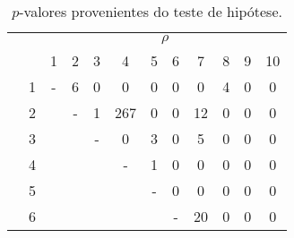 \begin{table}[phtb!]
\centering
\caption{$p$-valores provenientes do teste de hipótese.}
\begin{tabular}{cccccccccccc}
                         &    & \multicolumn{10}{c}{$\rho$}                                                                                                                                                                                                                           \\ \cline{3-12} 
                         &    & 1 & 2                        & 3                        & 4                        & 5                        & 6                        & 7                         & 8                        & 9                        & 10                       \\ \hline
                         & 1  & - & {\color[HTML]{32CB00} 6} & {\color[HTML]{32CB00} 0} & {\color[HTML]{32CB00} 0} & {\color[HTML]{32CB00} 0} & {\color[HTML]{32CB00} 0} & {\color[HTML]{32CB00} 0}  & {\color[HTML]{32CB00} 4} & {\color[HTML]{32CB00} 0} & {\color[HTML]{32CB00} 0} \\
                         & 2  &   & -                        & {\color[HTML]{32CB00} 1} & 267                      & {\color[HTML]{32CB00} 0} & {\color[HTML]{32CB00} 0} & {\color[HTML]{32CB00} 12}  & {\color[HTML]{32CB00} 0} & {\color[HTML]{32CB00} 0} & {\color[HTML]{32CB00} 0} \\
                         & 3  &   &                          & -                        & {\color[HTML]{32CB00} 0} & {\color[HTML]{32CB00} 3} & {\color[HTML]{32CB00} 0} & {\color[HTML]{32CB00} 5}  & {\color[HTML]{32CB00} 0} & {\color[HTML]{32CB00} 0} & {\color[HTML]{32CB00} 0} \\
                         & 4  &   &                          &                          & -                        & {\color[HTML]{32CB00} 1} & {\color[HTML]{32CB00} 0} & {\color[HTML]{32CB00} 0}  & {\color[HTML]{32CB00} 0} & {\color[HTML]{32CB00} 0} & {\color[HTML]{32CB00} 0} \\
                         & 5  &   &                          &                          &                          & -                        & {\color[HTML]{32CB00} 0} & {\color[HTML]{32CB00} 0}  & {\color[HTML]{32CB00} 0} & {\color[HTML]{32CB00} 0} & {\color[HTML]{32CB00} 0} \\
                         & 6  &   &                          &                          &                          &                          & -                        & {\color[HTML]{32CB00} 20} & {\color[HTML]{32CB00} 0} & {\color[HTML]{32CB00} 0} & {\color[HTML]{32CB00} 0} \\

\end{tabular}
\end{table}
